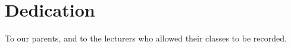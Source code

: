\section*{Dedication}

To our parents, and to the lecturers who allowed their classes to be recorded.

\pagebreak
